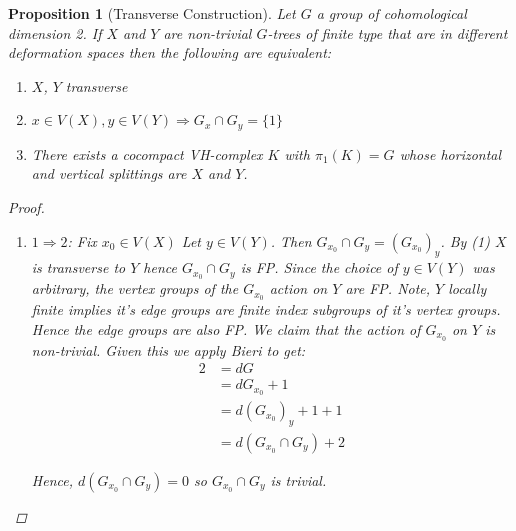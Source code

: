 \documentclass{article}
\theoremstyle{mystyle}
\newtheorem{pro}{Proposition}[section]
\theoremstyle{remark}
\begin{document}
\begin{pro}
    [Transverse Construction]
    \label{pro:transverseconstruction} 
 Let $G$ a group of cohomological dimension 2. If $X$ and $Y$ are non-trivial $G$-trees of finite type that are in different deformation spaces then the following are equivalent:
\begin{enumerate}
    \item $X$, $Y$ transverse
    \item $x \in V(X), y\in V(Y)\Longrightarrow G_x\cap G_y = \{1\}$
    \item There exists a cocompact VH-complex $K$ with $\pi_1(K) = G$ whose horizontal and vertical splittings are $X$ and $Y$.
\end{enumerate}
\begin{proof}
\begin{enumerate}
    \item $1\Rightarrow 2$: Fix $x_0 \in V(X)$ Let $y\in V(Y)$. Then $G_{x_0} \cap G_y = (G_{x_0})_y$. By (1) $X$ is transverse to $Y$ hence $G_{x_0}\cap G_y$ is FP. Since the choice of $y\in V(Y)$ was arbitrary, the vertex groups of the $G_{x_0}$ action on $Y$ are FP. Note, $Y$ locally finite implies it's edge groups are finite index subgroups of it's vertex groups. Hence the edge groups are also FP. We claim that the action of $G_{x_0}$ on $Y$ is non-trivial. Given this we apply Bieri to get:
    \begin{align*}
        2 &= dG\\
          &= dG_{x_0}+1\\
          &= d( G_{x_0} )_y+1+1\\
          &= d(G_{x_0}\cap G_y)+2
    \end{align*}
    
    Hence, $d(G_{x_0}\cap G_y)=0$ so $G_{x_0}\cap G_y$ is trivial.
    

\end{enumerate}
\end{proof}
\end{pro}
\end{document}

